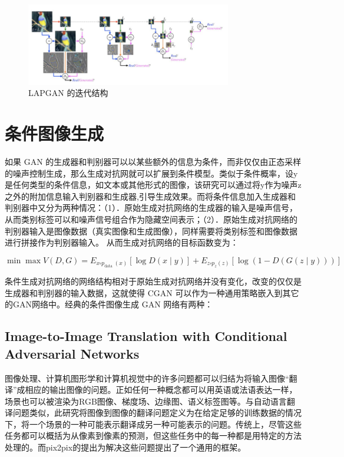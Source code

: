 \begin{figure}[htb]
\centering 
\includegraphics[width=0.8\textwidth]{img/m2t5.png} 
\caption{LAPGAN 的迭代结构}
\label{Test}
\end{figure}

\section{条件图像生成}

如果 GAN 的生成器和判别器可以以某些额外的信息为条件，而非仅仅由正态采样的噪声控制生成，那么生成对抗网就可以扩展到条件模型。类似于条件概率，设y是任何类型的条件信息，如文本或其他形式的图像，该研究可以通过将y作为噪声z之外的附加信息输入判别器和生成器,引导生成效果。而将条件信息加入生成器和判别器中又分为两种情况：（1）．原始生成对抗网络的生成器的输入是噪声信号，从而类别标签可以和噪声信号组合作为隐藏空间表示；（2）．原始生成对抗网络的判别器输入是图像数据（真实图像和生成图像），同样需要将类别标签和图像数据进行拼接作为判别器输入。
从而生成对抗网络的目标函数变为：

\begin{equation}
\min \max V(D, G)=E_{x \square p_{\text {data }}(x)}[\log D(x \mid y)]+E_{z \square p_{z}(z)}[\log (1-D(G(z \mid y)))]
\end{equation}

条件生成对抗网络的网络结构相对于原始生成对抗网络并没有变化，改变的仅仅是生成器和判别器的输入数据，这就使得 CGAN 可以作为一种通用策略嵌入到其它的GAN网络中。经典的条件图像生成 GAN 网络有两种：

\subsection{Image-to-Image Translation with Conditional Adversarial Networks}

图像处理、计算机图形学和计算机视觉中的许多问题都可以归结为将输入图像“翻译”成相应的输出图像的问题。正如任何一种概念都可以用英语或法语表达一样，场景也可以被渲染为RGB图像、梯度场、边缘图、语义标签图等。与自动语言翻译问题类似，此研究将图像到图像的翻译问题定义为在给定足够的训练数据的情况下，将一个场景的一种可能表示翻译成另一种可能表示的问题。传统上，尽管这些任务都可以概括为从像素到像素的预测，但这些任务中的每一种都是用特定的方法处理的。而pix2pix的提出为解决这些问题提出了一个通用的框架。

